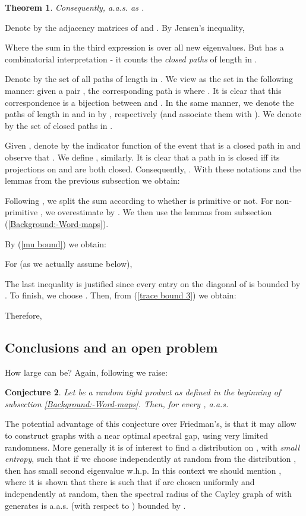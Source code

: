 \documentclass[12pt]{article}
\newtheorem{theorem}{Theorem}[section]
\newtheorem{open question}[theorem]{Open question}
\newtheorem{conjecture}[theorem]{Conjecture}
\newcommand{\proof}{{\par\noindent {\bf Proof}\space\space}}
\newcommand{\proofbox}{\begin{flushright}\end{flushright}}
\begin{document}
\begin{theorem}

Consequently,  a.a.s. as .
\end{theorem}
\proof
Denote by  the adjacency matrices of  and . By Jensen's inequality,

Where the sum in the third expression is over
all new eigenvalues. But  has a combinatorial interpretation - it counts the {\em closed paths} of length  in .

Denote by  the set of all paths of length  in . We view  as the set  in the following manner: given a pair , the corresponding path is  where . It is clear that this correspondence is a bijection between  and . In the same manner, we denote the paths of length  in  and in  by  ,  respectively (and associate them with ). We denote by  the set of closed paths in .

Given , denote by  the indicator function of the event that  is a closed path in  and observe that . We define , similarly. It is clear that a path  in  is closed iff its projections on  and  are both closed. Consequently, \mbox{.}
With these notations and the lemmas from the previous subsection we obtain:

Following \cite{Fri03}, we split the sum according to whether  is primitive or not. For non-primitive , we overestimate  by . We then use the lemmas from subsection (\ref{Background:-Word-maps}).


By (\ref{mu bound}) we obtain:

For  (as we actually assume below),

The last inequality is justified since every entry on the diagonal of  is bounded by .
To finish, we choose . Then, from (\ref{trace bound 3}) we obtain:

Therefore,

\proofbox

\subsection{Conclusions and an open problem}
How large can  be? Again, following \cite{Fri03} we raise:
\begin{conjecture}
Let  be a random tight product as defined in the beginning of subsection \ref{Background:-Word-maps}. Then, for every ,  a.a.s.
\end{conjecture}
The potential advantage of this conjecture over Friedman's, is that it may allow to construct graphs with a near optimal spectral gap, using very limited randomness. More generally it is of interest to
find a distribution  on , with {\em small entropy}, such that if we choose  independently at random from the distribution , then  has small second eigenvalue w.h.p.
In this context we should mention
\cite{BG08}, where it is shown that there is  such that if 
 are chosen uniformly and independently at random, then the spectral radius of the Cayley graph of 
with generates  is a.a.s. (with respect to ) bounded by .
\end{document}
